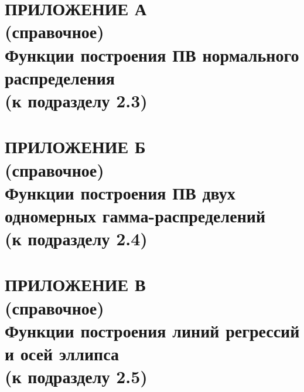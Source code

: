 \renewcommand{\thefigure}{\Asbuk{section}.\arabic{figure}}
\renewcommand{\thetable}{\Asbuk{section}.\arabic{table}}
\renewcommand{\thelstlisting}{\Asbuk{section}.\arabic{lstlisting}}

\pagestyle{fancy}
\fancyhf{} %
\fancyfoot[R]{\thepage}
\renewcommand{\headrulewidth}{0pt}
\renewcommand{\footrulewidth}{0pt}

\setlength{\headheight}{10mm}
\setlength{\headsep}{\baselineskip}

\section*{ПРИЛОЖЕНИЕ А\\(справочное)\\Функции построения ПВ нормального распределения\\(к подразделу 2.3)}
\thispagestyle{plain}
\setcounter{section}{1}
\setcounter{figure}{0}
\setcounter{table}{0}
\setcounter{lstlisting}{0}



\setlength{\headheight}{10mm}
\setlength{\headsep}{\baselineskip}


\section*{ПРИЛОЖЕНИЕ Б\\(справочное)\\Функции построения ПВ двух одномерных гамма-распределений \\(к подразделу 2.4)}
\thispagestyle{plain}
\setcounter{section}{2}
\setcounter{figure}{0}
\setcounter{table}{0}
\setcounter{lstlisting}{0}



\setlength{\headheight}{10mm}
\setlength{\headsep}{\baselineskip}

\section*{ПРИЛОЖЕНИЕ В\\(справочное)\\Функции построения линий регрессий и осей эллипса\\(к подразделу 2.5)}
\thispagestyle{plain}
\setcounter{section}{3}
\setcounter{figure}{0}
\setcounter{table}{0}
\setcounter{lstlisting}{0}


